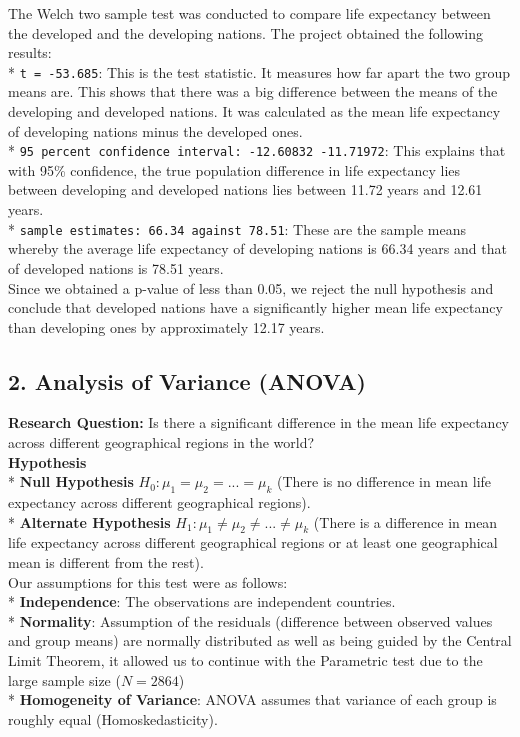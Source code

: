 \documentclass[
  10pt,
]{article}
\begin{document}
The Welch two sample test was conducted to compare life expectancy
between the developed and the developing nations. The project obtained
the following results:\\
* \texttt{t\ =\ -53.685}: This is the test statistic. It measures how
far apart the two group means are. This shows that there was a big
difference between the means of the developing and developed nations. It
was calculated as the mean life expectancy of developing nations minus
the developed ones.\\
* \texttt{95\ percent\ confidence\ interval:\ -12.60832\ -11.71972}:
This explains that with 95\% confidence, the true population difference
in life expectancy lies between developing and developed nations lies
between 11.72 years and 12.61 years.\\
* \texttt{sample\ estimates:\ 66.34\ against\ 78.51}: These are the
sample means whereby the average life expectancy of developing nations
is 66.34 years and that of developed nations is 78.51 years.\\

Since we obtained a p-value of less than 0.05, we reject the null
hypothesis and conclude that developed nations have a significantly
higher mean life expectancy than developing ones by approximately 12.17
years.\\

\subsection{2. Analysis of Variance
(ANOVA)}\label{analysis-of-variance-anova}

\textbf{Research Question:} Is there a significant difference in the
mean life expectancy across different geographical regions in the
world?\\

\textbf{Hypothesis}\\
* \textbf{Null Hypothesis} \(H_0: \mu_1 = \mu_2 = ...= \mu_k\) (There is
no difference in mean life expectancy across different geographical
regions).\\
* \textbf{Alternate Hypothesis}
\(H_1: \mu_1 \neq \mu_2 \neq ... \neq \mu_k\) (There is a difference in
mean life expectancy across different geographical regions or at least
one geographical mean is different from the rest).\\

Our assumptions for this test were as follows:\\
* \textbf{Independence}: The observations are independent countries.\\
* \textbf{Normality}: Assumption of the residuals (difference between
observed values and group means) are normally distributed as well as
being guided by the Central Limit Theorem, it allowed us to continue
with the Parametric test due to the large sample size (\(N = 2864\))\\
* \textbf{Homogeneity of Variance}: ANOVA assumes that variance of each
group is roughly equal (Homoskedasticity).\\
\end{document}
